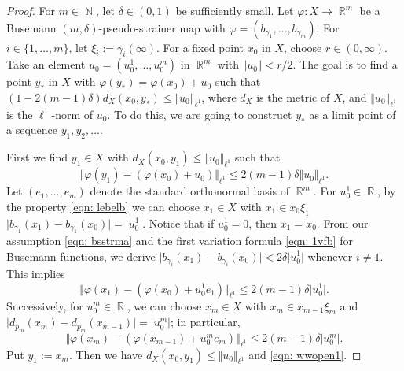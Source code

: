\documentclass[a4paper,12pt]{amsart}
\newcommand{\R}{\operatorname{\mathbb{R}}}
\newcommand{\N}{\operatorname{\mathbb{N}}}
\numberwithin{equation}{section}
\theoremstyle{plain}
\theoremstyle{definition}
\theoremstyle{remark}
\begin{document}
\begin{proof}
For $m \in \N$,
let $\delta \in (0,1)$ be sufficiently small.
Let $\varphi \colon X \to \R^m$
be a Busemann $(m,\delta)$-pseudo-strainer map
with $\varphi = \left( b_{\gamma_1}, \dots, b_{\gamma_m} \right)$.
For $i \in \{ 1, \dots, m \}$,
let $\xi_i := \gamma_i(\infty)$.
For a fixed point $x_0$ in $X$,
choose $r \in (0,\infty)$.
Take an element $u_0 = (u_0^1, \dots, u_0^m)$
in $\R^m$ with $\Vert u_0 \Vert < r/2$.
The goal is to find a point $y_{\ast}$ in $X$ 
with $\varphi(y_{\ast}) = \varphi(x_0) + u_0$
such that
$(1-2(m-1)\delta) d_X(x_0,y_{\ast}) \le \Vert u_0 \Vert_{\ell^1}$,
where
$d_X$ is the metric of $X$,
and
$\Vert u_0 \Vert_{\ell^1}$
is the $\ell^1$-norm of $u_0$. 
To do this,
we are going to construct $y_{\ast}$ as a limit point of a sequence
$y_1, y_2, \dots$.

First we find $y_1 \in X$ with 
$d_X(x_0,y_1) \le \Vert u_0 \Vert_{\ell^1}$
such that
\begin{equation}
\Vert \varphi(y_1) - (\varphi(x_0) + u_0) \Vert_{\ell^1}
\le 2(m-1) \delta \Vert u_0 \Vert_{\ell^1}.
\label{eqn: wwopen1}
\end{equation}
Let $(e_1,\dots,e_m)$ 
denote the standard orthonormal basis of $\R^m$.
For $u_0^1 \in \R$,
by the property \eqref{eqn: lebelb}
we can choose $x_1 \in X$ 
with $x_1 \in x_0\xi_1$ 
$\vert b_{\gamma_1}(x_1) - b_{\gamma_1}(x_0) \vert = \vert u_0^1 \vert$.
Notice that if $u_0^1 = 0$, then $x_1 = x_0$.
From our assumption \eqref{eqn: bsstrma}
and the first variation formula \eqref{eqn: 1vfb}
for Busemann functions,
we derive
$\vert b_{\gamma_i}(x_1) - b_{\gamma_i}(x_0) \vert < 2\delta \vert u_0^1 \vert$
whenever $i \neq 1$.
This implies
\[
\Vert \varphi(x_1) - (\varphi(x_0) + u_0^1 e_1) \Vert_{\ell^1}
\le 2(m-1) \delta \vert u_0^1 \vert.
\]
Successively,
for $u_0^m \in \R$,
we can choose $x_m \in X$ 
with $x_m \in x_{m-1}\xi_m$ 
and 
$\vert d_{p_m}(x_m) - d_{p_m}(x_{m-1}) \vert = \vert u_0^m \vert$;
in particular,
\[
\Vert
\varphi(x_m) - (\varphi(x_{m-1}) + u_0^m e_m ) \Vert_{\ell^1}
\le 2(m-1) \delta \vert u_0^m \vert.
\]
Put $y_1 := x_m$.
Then
we have $d_X(x_0,y_1) \le \Vert u_0 \Vert_{\ell^1}$
and \eqref{eqn: wwopen1}.


\end{proof}
\end{document}

